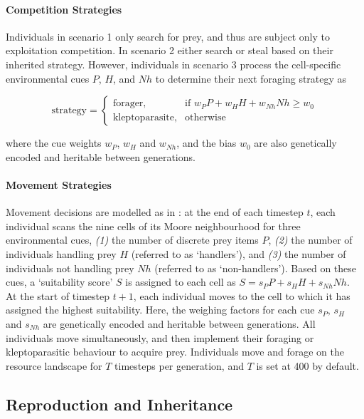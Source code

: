 \documentclass[11pt]{article}
\begin{document}
\paragraph{Competition Strategies}

Individuals in scenario 1 only search for prey, and thus are subject only to exploitation competition. 
In scenario 2 either search or steal based on their inherited strategy.
However, individuals in scenario 3 process the cell-specific environmental cues $P$, $H$, and $Nh$ to determine their next foraging strategy as
\begin{linenomath*}
    \begin{equation}
        \text{strategy} = 
    \begin{cases}
        \text{forager},& \text{if } w_PP + w_HH + w_{Nh}Nh \geq w_0\\
        \text{kleptoparasite},              & \text{otherwise}
    \end{cases}
    \end{equation}  
\end{linenomath*}
where the cue weights $w_P$, $w_H$ and $w_{Nh}$, and the bias $w_0$ are also genetically encoded and heritable between generations.

\paragraph{Movement Strategies}

Movement decisions are modelled as in \citep{netz2020}: at the end of each timestep $t$, each individual scans the nine cells of its Moore neighbourhood for three environmental cues, \textit{(1)} the number of discrete prey items $P$, \textit{(2)} the number of individuals handling  prey $H$ (referred to as `handlers'), and \textit{(3)} the number of individuals not handling prey $Nh$ (referred to as `non-handlers').
Based on these cues, a `suitability score' $S$ is assigned to each cell as $S = s_PP + s_HH + s_{Nh}Nh$.
At the start of timestep $t+1$, each individual moves to the cell to which it has assigned the highest suitability.
Here, the weighing factors for each cue $s_P$, $s_H$ and $s_{Nh}$ are genetically encoded and heritable between generations.
All individuals move simultaneously, and then implement their foraging or kleptoparasitic behaviour to acquire prey.
Individuals move and forage on the resource landscape for $T$ timesteps per generation, and $T$ is set at 400 by default.

\subsection{Reproduction and Inheritance}
\end{document}
